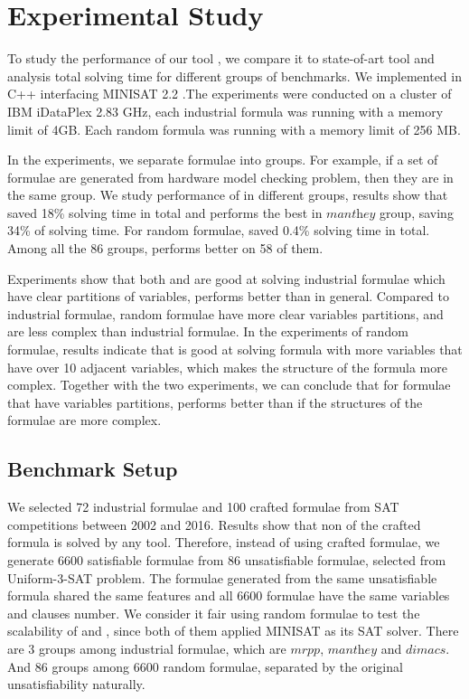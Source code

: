 \section{Experimental Study}\label{sec:expr}
To study the performance of our tool \tool, we compare it to state-of-art tool \minibones and analysis total solving time for different groups of benchmarks.
We implemented \tool in C++ interfacing MINISAT 2.2 \cite{MINISAT}.The experiments were conducted on a cluster of IBM iDataPlex 2.83 GHz, each industrial formula was running with a memory limit of 4GB. Each random formula was running with a memory limit of 256 MB.

In the experiments, we separate formulae into groups. For example, if a set of formulae are generated from hardware model checking problem, then they are in the same group. We study performance of \tool in different groups, results show that \tool saved 18\% solving time in total and performs the best in $\textit{manthey}$ group, saving 34\% of solving time.
For random formulae, \tool saved 0.4\% solving time in total. Among all the 86 groups, \tool performs better on 58 of them.

Experiments show that both \tool and \minibones are good at solving industrial formulae which have clear partitions of variables, \tool performs better than \minibones in general. Compared to industrial formulae, random formulae have more clear variables partitions, and are less complex than industrial formulae. In the experiments of random formulae, results indicate that \tool is good at solving formula with more variables that have over 10 adjacent variables, which makes the structure of the formula more complex. Together with the two experiments, we can conclude that for formulae that have variables partitions, \tool performs better than \minibones if the structures of the formulae are more complex.

\subsection{Benchmark Setup}

We selected 72 industrial formulae and 100 crafted formulae from SAT competitions between 2002 and 2016. Results show that non of the crafted formula is solved by any tool. Therefore, instead of using crafted formulae, we generate 6600 satisfiable formulae from 86 unsatisfiable formulae, selected from Uniform-3-SAT problem. The formulae generated from the same unsatisfiable formula shared the same features and all 6600 formulae have the same variables and clauses number. We consider it fair using random formulae to test the scalability of \tool and \minibones, since both of them applied MINISAT as its SAT solver.
There are 3 groups among industrial formulae, which are $\textit{mrpp}$, $\textit{manthey}$ and $\textit{dimacs}$. And 86 groups among 6600 random formulae, separated by the original unsatisfiability naturally.

